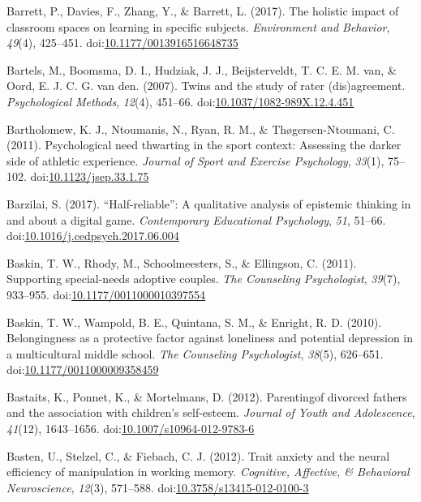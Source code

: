 \documentclass[english,man]{apa6}
\theoremstyle{definition}
\theoremstyle{definition}
\theoremstyle{definition}
\theoremstyle{remark}
\begin{document}
\hypertarget{ref-Barrett2017}{}
Barrett, P., Davies, F., Zhang, Y., \& Barrett, L. (2017). The holistic
impact of classroom spaces on learning in specific subjects.
\emph{Environment and Behavior}, \emph{49}(4), 425--451.
doi:\href{https://doi.org/10.1177/0013916516648735}{10.1177/0013916516648735}

\hypertarget{ref-Bartels2007}{}
Bartels, M., Boomsma, D. I., Hudziak, J. J., Beijsterveldt, T. C. E. M.
van, \& Oord, E. J. C. G. van den. (2007). Twins and the study of rater
(dis)agreement. \emph{Psychological Methods}, \emph{12}(4), 451--66.
doi:\href{https://doi.org/10.1037/1082-989X.12.4.451}{10.1037/1082-989X.12.4.451}

\hypertarget{ref-Bartholomew2011}{}
Bartholomew, K. J., Ntoumanis, N., Ryan, R. M., \& Thøgersen-Ntoumani,
C. (2011). Psychological need thwarting in the sport context: Assessing
the darker side of athletic experience. \emph{Journal of Sport and
Exercise Psychology}, \emph{33}(1), 75--102.
doi:\href{https://doi.org/10.1123/jsep.33.1.75}{10.1123/jsep.33.1.75}

\hypertarget{ref-Barzilai2017}{}
Barzilai, S. (2017). ``Half-reliable'': A qualitative analysis of
epistemic thinking in and about a digital game. \emph{Contemporary
Educational Psychology}, \emph{51}, 51--66.
doi:\href{https://doi.org/10.1016/j.cedpsych.2017.06.004}{10.1016/j.cedpsych.2017.06.004}

\hypertarget{ref-Baskin2011}{}
Baskin, T. W., Rhody, M., Schoolmeesters, S., \& Ellingson, C. (2011).
Supporting special-needs adoptive couples. \emph{The Counseling
Psychologist}, \emph{39}(7), 933--955.
doi:\href{https://doi.org/10.1177/0011000010397554}{10.1177/0011000010397554}

\hypertarget{ref-Baskin2010}{}
Baskin, T. W., Wampold, B. E., Quintana, S. M., \& Enright, R. D.
(2010). Belongingness as a protective factor against loneliness and
potential depression in a multicultural middle school. \emph{The
Counseling Psychologist}, \emph{38}(5), 626--651.
doi:\href{https://doi.org/10.1177/0011000009358459}{10.1177/0011000009358459}

\hypertarget{ref-Bastaits2012}{}
Bastaits, K., Ponnet, K., \& Mortelmans, D. (2012). Parentingof divorced
fathers and the association with children's self-esteem. \emph{Journal
of Youth and Adolescence}, \emph{41}(12), 1643--1656.
doi:\href{https://doi.org/10.1007/s10964-012-9783-6}{10.1007/s10964-012-9783-6}

\hypertarget{ref-Basten2012}{}
Basten, U., Stelzel, C., \& Fiebach, C. J. (2012). Trait anxiety and the
neural efficiency of manipulation in working memory. \emph{Cognitive,
Affective, \& Behavioral Neuroscience}, \emph{12}(3), 571--588.
doi:\href{https://doi.org/10.3758/s13415-012-0100-3}{10.3758/s13415-012-0100-3}
\end{document}
